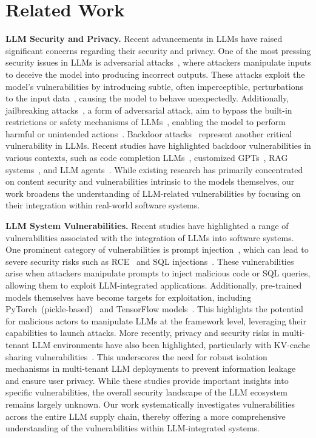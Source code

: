 \section{Related Work}

\noindent \textbf{LLM Security and Privacy.} 
Recent advancements in LLMs have raised significant concerns regarding their security and privacy. 
One of the most pressing security issues in LLMs is adversarial attacks~\cite{liu2024adversary,nicholas2023align,erfan2023surveyadversary}, where attackers manipulate inputs to deceive the model into producing incorrect outputs. These attacks exploit the model’s vulnerabilities by introducing subtle, often imperceptible, perturbations to the input data~\cite{andy2023universal}, causing the model to behave unexpectedly. Additionally, jailbreaking attacks~\cite{xu2024jailbreak}, a form of adversarial attack, aim to bypass the built-in restrictions or safety mechanisms of LLMs~\cite{alexander2023jailbroken}, enabling the model to perform harmful or unintended actions~\cite{shen2024dan}. 
Backdoor attacks~\cite{li2024backdoorllm,zhao2025surveybackdoor} represent another critical vulnerability in LLMs. Recent studies have highlighted backdoor vulnerabilities in various contexts, such as code completion LLMs~\cite{yan2024codebackdoor}, customized GPTs~\cite{zhang2024gptsbackdoor}, RAG systems~\cite{cheng2024trojanrag}, and LLM agents~\cite{wang2024badagent,yang2024agentbackdoor}.
While existing research has primarily concentrated on content security and vulnerabilities intrinsic to the models themselves, our work broadens the understanding of LLM-related vulnerabilities by focusing on their integration within real-world software systems.

\noindent \textbf{LLM System Vulnerabilities.}
Recent studies have highlighted a range of vulnerabilities associated with the integration of LLMs into software systems. 
One prominent category of vulnerabilities is prompt injection~\cite{sahar2023promptinjection,liu2023houyi}, which can lead to severe security risks such as RCE~\cite{liu2024llmrce} and SQL injections~\cite{pedro2025prompt2sql}. These vulnerabilities arise when attackers manipulate prompts to inject malicious code or SQL queries, allowing them to exploit LLM-integrated applications. 
Additionally, pre-trained models themselves have become targets for exploitation, including PyTorch~(pickle-based)~\cite{zhao2024malhug} and TensorFlow models~\cite{zhu2025tensorflow}. This highlights the potential for malicious actors to manipulate LLMs at the framework level, leveraging their capabilities to launch attacks. 
More recently, privacy and security risks in multi-tenant LLM environments have also been highlighted, particularly with KV-cache sharing vulnerabilities~\cite{song2024kvcache}. This underscores the need for robust isolation mechanisms in multi-tenant LLM deployments to prevent information leakage and ensure user privacy.
While these studies provide important insights into specific vulnerabilities, the overall security landscape of the LLM ecosystem remains largely unknown. Our work systematically investigates vulnerabilities across the entire LLM supply chain, thereby offering a more comprehensive understanding of the vulnerabilities within LLM-integrated systems.